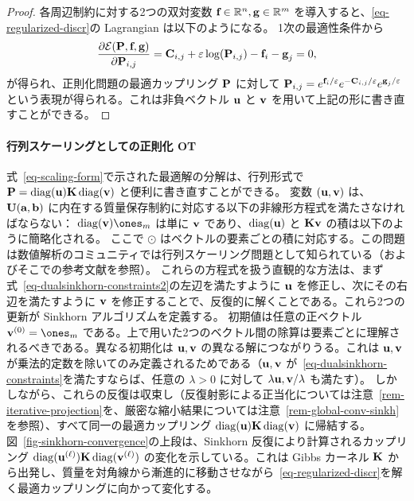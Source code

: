 \begin{proof}
各周辺制約に対する2つの双対変数 $\fD\in\RR^n,\gD\in\RR^m$ を導入すると、\eqref{eq-regularized-discr}の Lagrangian は以下のようになる。
1次の最適性条件から
$$
	\frac{\partial\Lag(\P,\fD,\gD)}{\partial \P_{i,j}}= \C_{i,j} + \varepsilon \log(\P_{i,j}) - \fD_i -\gD_j=0,
$$
が得られ、正則化問題の最適カップリング $\P$ に対して $\P_{i,j}=e^{\fD_i/\varepsilon}e^{-\C_{i,j}/\varepsilon}e^{\gD_j/\varepsilon}$ という表現が得られる。これは非負ベクトル $\uD$ と $\vD$ を用いて上記の形に書き直すことができる。
\end{proof}

\paragraph{行列スケーリングとしての正則化 OT}

式~\eqref{eq-scaling-form}で示された最適解の分解は、行列形式で $\P=\diag(\uD)\K\diag(\vD)$ と便利に書き直すことができる。
変数 $(\uD,\vD)$ は、$\CouplingsD(\a,\b)$ に内在する質量保存制約に対応する以下の非線形方程式を満たさなければならない：
$\diag(\vD)\ones_m$ は単に $\vD$ であり、$\diag(\uD)$ と $\K \vD$ の積は以下のように簡略化される。
\eql{\label{eq-dualsinkhorn-constraints2}
	\uD \odot (\K \vD) = \a
	\qandq
	\vD \odot (\transp{\K}\uD) = \b,
}
ここで $\odot$ はベクトルの要素ごとの積に対応する。この問題は数値解析のコミュニティでは行列スケーリング問題として知られている（\citep{nemirovski1999complexity}およびそこでの参考文献を参照）。
これらの方程式を扱う直観的な方法は、まず式~\eqref{eq-dualsinkhorn-constraints2}の左辺を満たすように $\uD$ を修正し、次にその右辺を満たすように $\vD$ を修正することで、反復的に解くことである。これら2つの更新が Sinkhorn アルゴリズムを定義する。
\eql{\label{eq-sinkhorn}
	\itt{\uD} \eqdef \frac{\a}{\K \it{\vD}}
	\qandq
	\itt{\vD} \eqdef \frac{\b}{\transp{\K}\itt{\uD}},
}
初期値は任意の正ベクトル $\init{\vD} = \ones_m$ である。上で用いた2つのベクトル間の除算は要素ごとに理解されるべきである。異なる初期化は $\uD,\vD$ の異なる解につながりうる。これは $\uD,\vD$ が乗法的定数を除いてのみ定義されるためである（$\uD,\vD$ が~\eqref{eq-dualsinkhorn-constraints}を満たすならば、任意の $\lambda>0$ に対して $\lambda\uD,\vD/\lambda$ も満たす）。
しかしながら、これらの反復は収束し（反復射影による正当化については注意~\ref{rem-iterative-projection}を、厳密な縮小結果については注意~\ref{rem-global-conv-sinkh}を参照）、すべて同一の最適カップリング $\diag(\uD)\K\diag(\vD)$ に帰結する。
図~\ref{fig-sinkhorn-convergence}の上段は、Sinkhorn 反復により計算されるカップリング $\diag(\it{\uD})\K\diag(\it{\vD})$ の変化を示している。これは Gibbs カーネル $\K$ から出発し、質量を対角線から漸進的に移動させながら~\eqref{eq-regularized-discr}を解く最適カップリングに向かって変化する。

